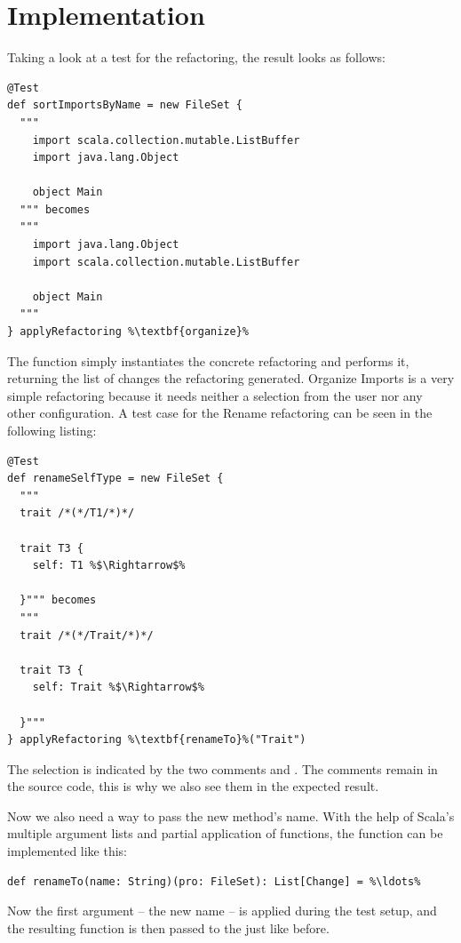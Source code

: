 \documentclass[10pt,a4paper,oneside]{scrreprt}
\begin{document}
\section{Implementation}

Taking a look at a test for the  refactoring, the result looks as follows:

\begin{lstlisting}
@Test
def sortImportsByName = new FileSet {
  """
    import scala.collection.mutable.ListBuffer
    import java.lang.Object

    object Main
  """ becomes
  """
    import java.lang.Object
    import scala.collection.mutable.ListBuffer

    object Main
  """
} applyRefactoring %\textbf{organize}%
\end{lstlisting}

The  function simply instantiates the concrete refactoring and performs it, returning the list of changes the refactoring generated. Organize Imports is a very simple refactoring because it needs neither a selection from the user nor any other configuration. A test case for the Rename refactoring can be seen in the following listing:

\begin{lstlisting}
@Test
def renameSelfType = new FileSet {
  """
  trait /*(*/T1/*)*/

  trait T3 {
    self: T1 %$\Rightarrow$%

  }""" becomes
  """
  trait /*(*/Trait/*)*/

  trait T3 {
    self: Trait %$\Rightarrow$%

  }"""
} applyRefactoring %\textbf{renameTo}%("Trait")
\end{lstlisting}

The selection is indicated by the two comments \src{/*(*/} and \src{/*)*/}. The comments remain in the source code, this is why we also see them in the expected result. 

Now we also need a way to pass the new method's name. With the help of Scala's multiple argument lists and partial application of functions, the  function can be implemented like this:

\begin{lstlisting}
def renameTo(name: String)(pro: FileSet): List[Change] = %\ldots%
\end{lstlisting}

Now the first argument -- the new name -- is applied during the test setup, and the resulting function is then passed to the  just like before.
\end{document}
